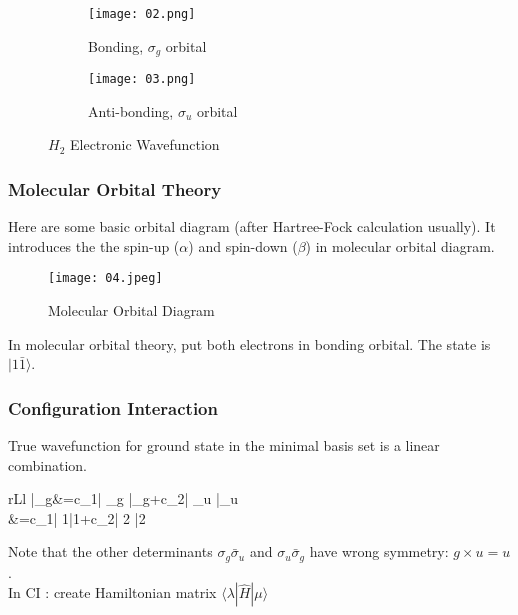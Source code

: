 \documentclass[a4paper, 12pt]{article}
\begin{document}
\begin{figure}[H]
    \begin{subfigure}{.5\textwidth}
        \centering
        \texttt{[image: 02.png]}
        \caption{Bonding, $\sigma_g$ orbital}
        \label{fig:sub-first2}
    \end{subfigure}
    \begin{subfigure}{.5\textwidth}
        \centering
        \texttt{[image: 03.png]}
        \caption{Anti-bonding, $\sigma_u$ orbital }
        \label{fig:sub-second2}
    \end{subfigure}
    \caption{$H_2$ Electronic Wavefunction}
    \label{fig:fig2}
\end{figure}

\subsubsection{Molecular Orbital Theory}
Here are some basic orbital diagram (after Hartree-Fock calculation usually). It introduces the the spin-up ($\alpha$) and spin-down ($\beta$) in molecular orbital diagram.
\begin{figure}[H]
        \centering
        \texttt{[image: 04.jpeg]}
        \caption{Molecular Orbital Diagram}
        \label{fig:sub-first2}
\end{figure}
\tab In molecular orbital theory, put both electrons in bonding orbital. The state is $|1\bar{1}\rangle$.

\subsubsection{Configuration Interaction}
True wavefunction for ground state in the minimal basis set is a linear combination.
	 \begin{IEEEeqnarray}{rLl}
|\psi_g\rangle &=c_1| \sigma_g \bar{\sigma}_g\rangle +c_2| \sigma_u \bar{\sigma}_u\rangle \notag  \\
&=c_1| 1\bar{1}\rangle +c_2| 2 \bar{2}\rangle
	\end{IEEEeqnarray}
\tab Note that the other determinants $\sigma_g\bar{\sigma}_u$ and  $\sigma_u\bar{\sigma}_g$ have wrong symmetry: $g \times u = u$.\\
\tab In CI : create Hamiltonian matrix $\langle \lambda|\hat{H}|\mu \rangle$
	
\end{document}

